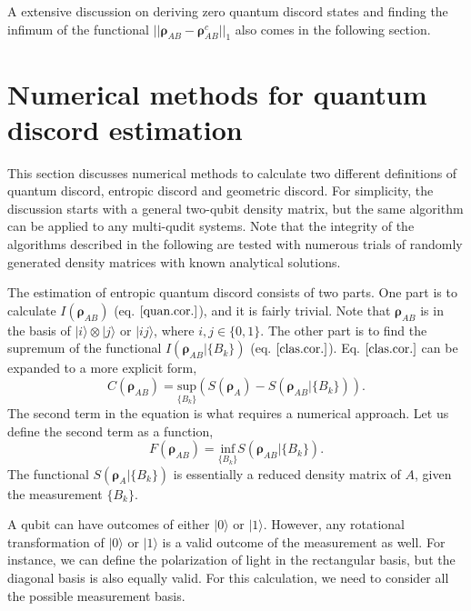 \documentclass[%
 reprint,
 amsmath,amssymb,
 aps,
]{revtex4-1}
\begin{document}
A extensive discussion on deriving zero quantum discord states and finding the infimum of the functional $||\boldsymbol{\rho}_{AB} - \boldsymbol{\rho}_{AB}^{c}||_{1}$ also comes in the following section.

\section{Numerical methods for quantum discord estimation}
\noindent This section discusses numerical methods to calculate two different definitions of quantum discord, entropic discord and geometric discord. For simplicity, the discussion starts with a general two-qubit density matrix, but the same algorithm can be applied to any multi-qudit systems. Note that the integrity of the algorithms described in the following are tested with numerous trials of randomly generated density matrices with known analytical solutions.

The estimation of entropic quantum discord consists of two parts. One part is to calculate $\textit{I}(\boldsymbol{\rho}_{AB})$ (eq. $\ref{quan.cor.}$), and it is fairly trivial. Note that $\boldsymbol{\rho}_{AB}$ is in the basis of $|i\rangle \otimes |j\rangle$ or $|ij\rangle$, where $i, j \in \{0, 1\}$. The other part is to find the supremum of the functional $\textit{I}(\boldsymbol{\rho}_{AB}|\{B_k\})$ (eq. $\ref{clas.cor.}$). Eq. $\ref{clas.cor.}$ can be expanded to a more explicit form, 
\begin{equation}
\textit{C}(\boldsymbol{\rho}_{AB}) = \underset{\{B_k\}}{\text{sup}} (S(\boldsymbol{\rho}_A) - S(\boldsymbol{\rho}_{AB}|\{B_k\})) \text{.}
\end{equation}
\noindent The second term in the equation is what requires a numerical approach. Let us define the second term as a function, 
\begin{equation}
\textit{F}(\boldsymbol{\rho}_{AB}) = \underset{\{B_k\}}{\text{inf}} S(\boldsymbol{\rho}_{AB}|\{B_k\}) \label{func.} \textit{.}
\end{equation}
\noindent The functional $S(\boldsymbol{\rho}_A|\{B_k\})$ is essentially a reduced density matrix of $A$, given the measurement $\{B_k\}$.

A qubit can have outcomes of either $|0\rangle$ or $|1\rangle$. However, any rotational transformation of $|0\rangle$ or $|1\rangle$ is a valid outcome of the measurement as well. For instance, we can define the polarization of light in the rectangular basis, but the diagonal basis is also equally valid. For this calculation, we need to consider all the possible measurement basis.
\end{document}
